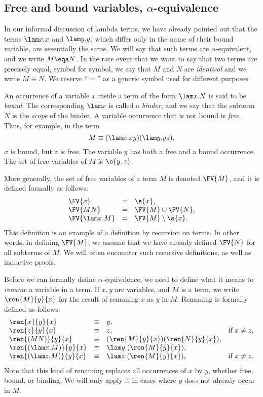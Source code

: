 \documentclass[12pt]{article}
\begin{document}
\subsection{Free and bound variables, $\alpha$-equivalence}

In our informal discussion of lambda terms, we have already pointed
out that the terms $\lam x.x$ and $\lam y.y$, which differ only in the
name of their bound variable, are essentially the same. We will say
that such terms are $\alpha$-equivalent, and we write $M\eqa N$.  In
the rare event that we want to say that two terms are precisely equal,
symbol for symbol, we say that $M$ and $N$ are {\em identical} and we
write $M\equiv N$. We reserve ``$=$'' as a generic symbol used for
different purposes.

An occurrence of a variable $x$ inside a term of the form $\lam x.N$
is said to be {\em bound}. The corresponding $\lam x$ is called a {\em
  binder}, and we say that the subterm $N$ is the {\em scope} of the
binder. A variable occurrence that is not bound is {\em free}.  Thus,
for example, in the term
\[   M \equiv (\lam x.xy)(\lam y.yz), \]
$x$ is bound, but $z$ is free. The variable $y$ has both a free and a
bound occurrence. The set of free variables of $M$ is $\s{y,z}$. 

More generally, the set of free variables of a term $M$ is denoted
$\FV{M}$, and it is defined formally as follows:
\[ \begin{array}{lll}
  \FV{x} &=& \s{x}, \\
  \FV{MN} &=& \FV{M}\cup \FV{N}, \\
  \FV{\lam x.M} &=& \FV{M} \setminus \s{x}.
\end{array}
\]
This definition is an example of a definition by recursion on
terms. In other words, in defining $\FV{M}$, we assume that we have
already defined $\FV{N}$ for all subterms of $M$. We will often
encounter such recursive definitions, as well as inductive proofs. 

Before we can formally define $\alpha$-equivalence, we need to define
what it means to {\em rename} a variable in a term. If $x,y$ are
variables, and $M$ is a term, we write $\ren{M}{y}{x}$ for the result of
renaming $x$ as $y$ in $M$. Renaming is formally defined as follows:
\[ \begin{array}{llll}
  \ren{x}{y}{x} &\equiv& y, \\
  \ren{z}{y}{x} &\equiv& z, & \mbox{if $x\neq z$,} \\
  \ren{(MN)}{y}{x} &\equiv& (\ren{M}{y}{x})(\ren{N}{y}{x}), \\
  \ren{(\lam x.M)}{y}{x} &\equiv& \lam y.(\ren{M}{y}{x}), \\
  \ren{(\lam z.M)}{y}{x} &\equiv& \lam z.(\ren{M}{y}{x}), & \mbox{if
  $x\neq z$.}
\end{array}
\]
Note that this kind of renaming replaces all occurrences of $x$ by
$y$, whether free, bound, or binding. We will only apply it in cases
where $y$ does not already occur in $M$. 
\end{document}
